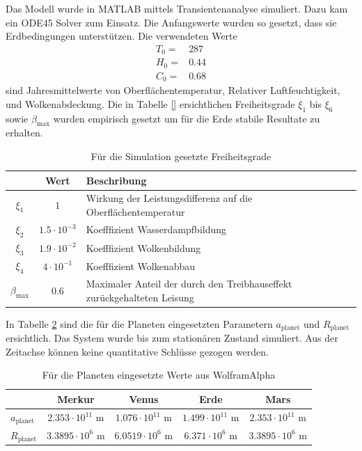 \begin{refsection}
Das Modell wurde in MATLAB mittels Transientenanalyse simuliert. Dazu kam ein ODE45 Solver zum Einsatz. Die Anfangswerte wurden so gesetzt, dass sie Erdbedingungen unterstützen. Die verwendeten Werte
\begin{equation}
\begin{matrix}
T_0 = & 287 \\
H_0 = & 0.44 \\
C_0 = & 0.68
\end{matrix}
\end{equation}sind Jahresmittelwerte von Oberflächentemperatur, Relativer Luftfeuchtigkeit, und Wolkenabdeckung.
Die in Tabelle \ref{} ersichtlichen Freiheitsgrade $\xi_1$ bis $\xi_6$ sowie $\beta_{\text{max}}$ wurden empirisch gesetzt um für die Erde stabile Resultate zu erhalten.
\begin{center}
\begin{table}[!h]
	\center
	\begin{tabular}{c|c|l}
        & Wert                  & Beschribung \\
  \hline
$\xi_1$ & $1$					& Wirkung der Leistungsdifferenz auf die Oberflächentemperatur\\
$\xi_2$ & $1.5 \cdot 10^{-3}$	& Koefffizient Wasserdampfbildung\\
$\xi_3$ & $1.9 \cdot 10^{-2}$	& Koefffizient Wolkenbildung \\
$\xi_4$ & $4   \cdot 10^{-1}$	& Koefffizient Wolkenabbau \\
$\beta_{\text{max}}$ & $0.6$					& Maximaler Anteil der durch den Treibhauseffekt zurückgehalteten Leisung
	\end{tabular}
	\caption{Für die Simulation gesetzte Freiheitsgrade}
	\label{planeten:xiValues}
\end{table}
\end{center}
In Tabelle \ref{planeten:planetValues} sind die für die Planeten eingesetzten Parametern $a_{\text{planet}}$ und $R_{\text{planet}}$ ersichtlich. Das System wurde bis zum stationären Zustand simuliert. Aus der Zeitachse können keine quantitative Schlüsse gezogen werden.
\begin{center}
\begin{table}[!h]
	\center
	\begin{tabular}{l|c c c c}
                        & Merkur                    & Venus                    & Erde                    & Mars     \\
  \hline
  $a_{\text{planet}}$   & $2.353 \cdot 10^{11}$ m   & $1.076 \cdot 10^{11}$ m  & $1.499 \cdot 10^{11}$ m & $2.353 \cdot 10^{11}$ m \\
  $R_{\text{planet}}$   & $3.3895 \cdot 10^{6}$ m   & $6.0519 \cdot 10^{6}$ m  & $6.371 \cdot 10^{6}$ m  & $3.3895 \cdot 10^{6}$ m 
\end{tabular}
\caption{Für die Planeten eingesetzte Werte aus WolframAlpha}
\label{planeten:planetValues}
\end{table}
\end{center}


\end{refsection}
